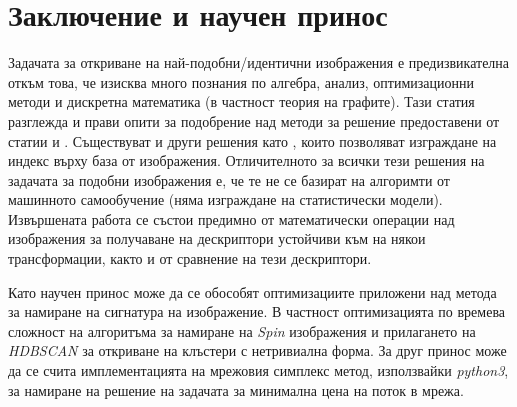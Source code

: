 \documentclass[a4paper,12pt]{article}
\begin{document}
\section{Заключение и научен принос}

Задачата за откриване на най-подобни/идентични изображения е предизвикателна откъм това, че изисква много познания по алгебра, анализ, оптимизационни методи и дискретна математика (в частност теория на графите). Тази статия разглежда и прави опити за подобрение над методи за решение предоставени от статии \cite{spinimages} и \cite{sift}. Съществуват и други решения като \cite{spinimages}, които позволяват изграждане на индекс върху база от изображения. Отличителното за всички тези решения на задачата за подобни изображения е, че те не се базират на алгоримти от машинното самообучение (няма изграждане на статистически модели). Извършената работа се състои предимно от математически операции над изображения за получаване на дескриптори устойчиви към на някои трансформации, както и от сравнение на тези дескриптори.

\bigbreak

Като научен принос може да се обособят оптимизациите приложени над метода за намиране на сигнатура на изображение. В частност оптимизацията по времева сложност на алгоритъма за намиране на \textit{Spin} изображения и прилагането на \textit{HDBSCAN} за откриване на клъстери с нетривиална форма. За друг принос може да се счита имплементацията на мрежовия симплекс метод, използвайки \textit{python3}, за намиране на решение на задачата за минимална цена на поток в мрежа.

\printbibliography[title={Използвана литература}]
\end{document}
